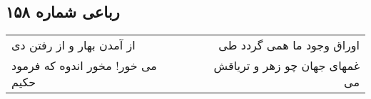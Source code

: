 \begin{center}
\section*{رباعی شماره ۱۵۸}
\label{sec:sh158}
\begin{longtable}{l p{0.5cm} r}
از آمدن بهار و از رفتن دی
&&
اوراق وجود ما همی گردد طی
\\
می خور! مخور اندوه که فرمود حکیم
&&
غمهای جهان چو زهر و تریاقش می
\\
\end{longtable}
\end{center}
